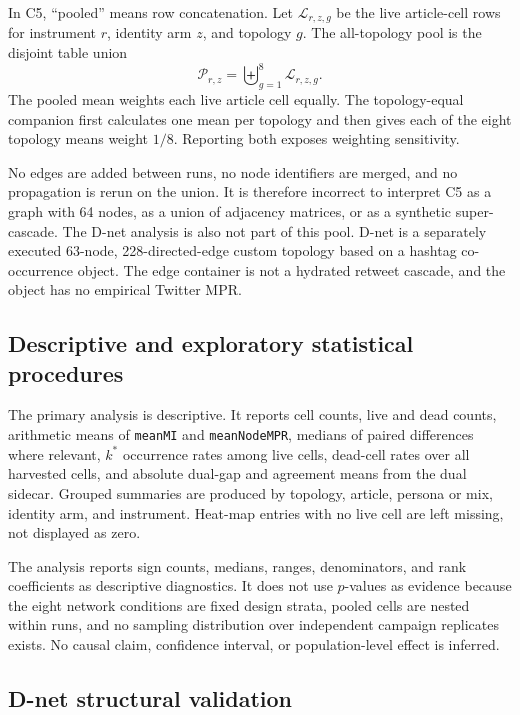 In C5, ``pooled'' means row concatenation.  Let
\(\mathcal{L}_{r,z,g}\) be the live article-cell rows for instrument \(r\), identity arm
\(z\), and topology \(g\).  The all-topology pool is the disjoint table union
\[
  \mathcal{P}_{r,z}
  =\biguplus_{g=1}^{8}\mathcal{L}_{r,z,g}.
\]
The pooled mean weights each live article cell equally.  The topology-equal companion
first calculates one mean per topology and then gives each of the eight topology means
weight \(1/8\).  Reporting both exposes weighting sensitivity.

No edges are added between runs, no node identifiers are merged, and no propagation is
rerun on the union.  It is therefore incorrect to interpret C5 as a graph with 64
nodes, as a union of adjacency matrices, or as a synthetic super-cascade.  The D-net
analysis is also not part of this pool.  D-net is a separately executed 63-node,
228-directed-edge custom topology based on a hashtag co-occurrence object.  The edge
container is not a hydrated retweet cascade, and the object has no empirical
Twitter MPR.

\subsection{Descriptive and exploratory statistical procedures}
\label{sec:mm-statistics}

The primary analysis is descriptive.  It reports cell counts, live and dead counts,
arithmetic means of \texttt{meanMI} and \texttt{meanNodeMPR}, medians of paired
differences where relevant, \(k^{*}\) occurrence rates among live cells, dead-cell
rates over all harvested cells, and absolute dual-gap and agreement means from the
dual sidecar.  Grouped summaries are produced by topology, article, persona or mix,
identity arm, and instrument.  Heat-map entries with no live cell are left missing,
not displayed as zero.

The analysis reports sign counts, medians, ranges, denominators, and rank
coefficients as descriptive diagnostics. It does not use \(p\)-values as
evidence because the eight network conditions are fixed design strata, pooled
cells are nested within runs, and no sampling distribution over independent
campaign replicates exists. No causal claim, confidence interval, or
population-level effect is inferred.

\subsection{D-net structural validation}
\label{sec:mm-dnet-validation}

